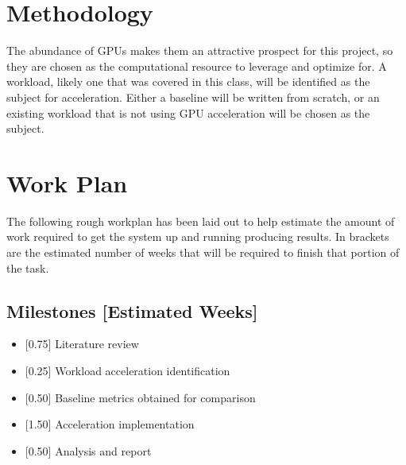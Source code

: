 \documentclass[10pt, oneside, letterpaper]{article}
\begin{document}

\section{Methodology}

The abundance of GPUs makes them an attractive prospect for this project, so they are chosen as the computational resource to leverage and optimize for. A workload, likely one that was covered in this class, will be identified as the subject for acceleration. Either a baseline will be written from scratch, or an existing workload that is not using GPU acceleration will be chosen as the subject.


\section{Work Plan}

The following rough workplan has been laid out to help estimate the amount of work required to get the system up and running producing results. In brackets are the estimated number of weeks that will be required to finish that portion of the task.

\subsection{Milestones [Estimated Weeks]}

\begin{itemize}
  \item {[0.75]} Literature review
  \item {[0.25]} Workload acceleration identification
  \item {[0.50]} Baseline metrics obtained for comparison
  \item {[1.50]} Acceleration implementation
  \item {[0.50]} Analysis and report
\end{itemize}

\nocite{*}



\end{document}
